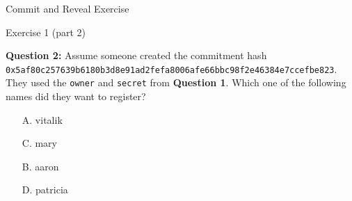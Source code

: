 \documentclass[]{beamer}
\begin{document}
\begin{frame}{Commit and Reveal Exercise}

	\begin{exercise}{Exercise 1 (part 2)}
	
		\textbf{Question 2:} Assume someone created the commitment hash \texttt{0x5af80c257639b6180b3d8e91ad2fefa8006afe66bbc98f2e46384e7ccefbe823}. They used the \texttt{owner} and \texttt{secret} from \textbf{Question 1}. Which one of the following names did they want to register?
			
		\vspace{-0.5em}
		\begin{multicols}{2}
				\begin{itemize}
					\item[A.] vitalik
					\item[C.] mary
					\item[B.] aaron
					\item[D.] patricia
				\end{itemize}
			\end{multicols}
		
	\end{exercise}
	
\end{frame}
\end{document}
